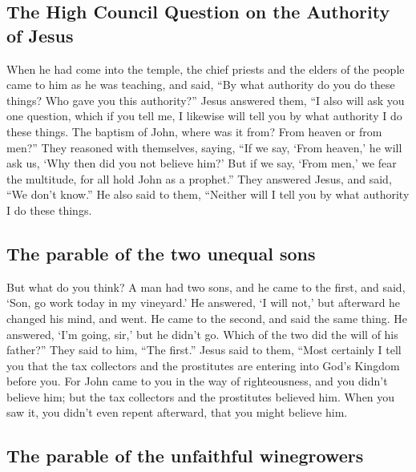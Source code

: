\hypertarget{the-high-council-question-on-the-authority-of-jesus}{%
\subsection{The High Council Question on the Authority of
Jesus}\label{the-high-council-question-on-the-authority-of-jesus}}

 When he had come into the temple, the chief priests and
the elders of the people came to him as he was teaching, and said, ``By
what authority do you do these things? Who gave you this authority?''
 Jesus answered them, ``I also will ask you one question,
which if you tell me, I likewise will tell you by what authority I do
these things.  The baptism of John, where was it from?
From heaven or from men?'' They reasoned with themselves, saying, ``If
we say, `From heaven,' he will ask us, `Why then did you not believe
him?'  But if we say, `From men,' we fear the multitude,
for all hold John as a prophet.''  They answered Jesus,
and said, ``We don't know.'' He also said to them, ``Neither will I tell
you by what authority I do these things.

\hypertarget{the-parable-of-the-two-unequal-sons}{%
\subsection{The parable of the two unequal
sons}\label{the-parable-of-the-two-unequal-sons}}

 But what do you think? A man had two sons, and he came
to the first, and said, `Son, go work today in my vineyard.'
 He answered, `I will not,' but afterward he changed his
mind, and went.  He came to the second, and said the same
thing. He answered, `I'm going, sir,' but he didn't go. 
Which of the two did the will of his father?'' They said to him, ``The
first.'' Jesus said to them, ``Most certainly I tell you that the tax
collectors and the prostitutes are entering into God's Kingdom before
you.  For John came to you in the way of righteousness,
and you didn't believe him; but the tax collectors and the prostitutes
believed him. When you saw it, you didn't even repent afterward, that
you might believe him.

\hypertarget{the-parable-of-the-unfaithful-winegrowers}{%
\subsection{The parable of the unfaithful
winegrowers}\label{the-parable-of-the-unfaithful-winegrowers}}

